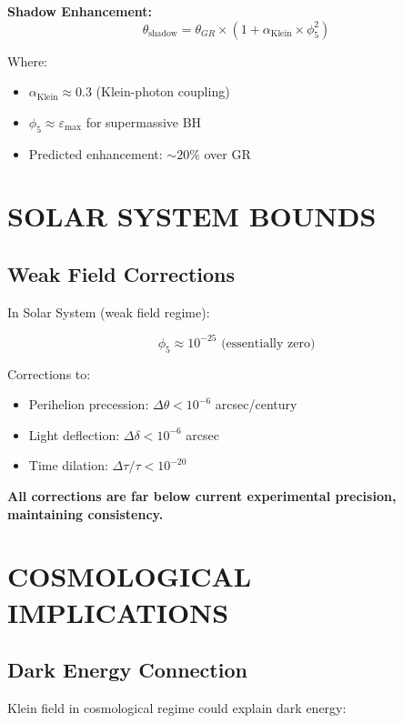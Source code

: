 \documentclass[12pt,a4paper]{article}
\begin{document}
\textbf{Shadow Enhancement:}
\begin{equation}
\theta_{\text{shadow}} = \theta_{GR} \times (1 + \alpha_{\text{Klein}} \times \phi_5^2)
\end{equation}

Where:
\begin{itemize}
\item $\alpha_{\text{Klein}} \approx 0.3$ (Klein-photon coupling)
\item $\phi_5 \approx \varepsilon_{\max}$ for supermassive BH
\item Predicted enhancement: $\sim 20\%$ over GR
\end{itemize}

\section{SOLAR SYSTEM BOUNDS}

\subsection{Weak Field Corrections}

In Solar System (weak field regime):

\begin{equation}
\phi_5 \approx 10^{-25} \text{ (essentially zero)}
\end{equation}

Corrections to:
\begin{itemize}
\item Perihelion precession: $\Delta\theta < 10^{-6}$ arcsec/century
\item Light deflection: $\Delta\delta < 10^{-6}$ arcsec
\item Time dilation: $\Delta\tau/\tau < 10^{-20}$
\end{itemize}

\textbf{All corrections are far below current experimental precision, maintaining consistency.}

\section{COSMOLOGICAL IMPLICATIONS}

\subsection{Dark Energy Connection}

Klein field in cosmological regime could explain dark energy:
\end{document}
